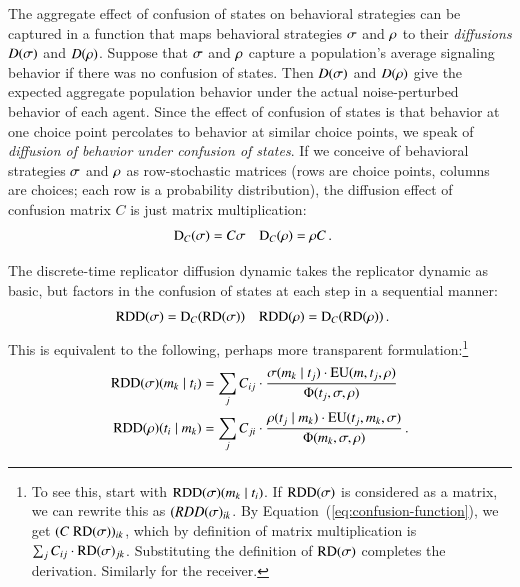 \documentclass[fleqn,reqno,10pt]{article}
\newcommand{\RD}{\ensuremath{\mathrm{RD}}} %
\newcommand{\RDD}{\ensuremath{\mathrm{RDD}}} %
\newcommand{\Diff}{\ensuremath{\mathrm{D}}} %
\begin{document}
The aggregate effect of confusion of states on behavioral strategies
can be captured in a function that maps behavioral strategies
$\sigma$ and $\rho$ to their \emph{diffusions} $D(\sigma)$ and
$D(\rho)$. Suppose that $\sigma$ and $\rho$ capture a
population's average signaling behavior if there was no confusion of
states. Then $D(\sigma)$ and $D(\rho)$ give the expected aggregate
population behavior under the actual noise-perturbed behavior of each
agent. Since the effect of confusion of states is that behavior at one
choice point percolates to behavior at similar choice points, we speak
of \emph{diffusion of behavior under confusion of states}. If we
conceive of behavioral strategies $\sigma$ and $\rho$ as
row-stochastic matrices (rows are choice points, columns are choices;
each row is a probability distribution), the diffusion effect of
confusion matrix $C$ is just matrix multiplication:
\begin{align}
  \label{eq:confusion-function}
  \Diff_C(\Sstrat) & = C \Sstrat &    \Diff_C(\Rstrat) & = \Rstrat C\,.
\end{align}

The discrete-time replicator diffusion dynamic takes the replicator
dynamic as basic, but factors in the confusion of states at each step
in a sequential manner:
\begin{align*}
  \RDD(\Sstrat) & = \Diff_C(\RD(\Sstrat)) &   \RDD(\Rstrat) & = \Diff_C(\RD(\Rstrat)) \,.
\end{align*}
This is equivalent to the following, perhaps more transparent
formulation:\footnote{To see this, start with $\RDD(\Sstrat)(\messg_k
  \probbar \state_i)$. If $\RDD(\Sstrat)$ is considered as a matrix,
  we can rewrite this as $(RDD(\sigma)_{ik}$. By
  Equation~(\ref{eq:confusion-function}), we get $(C \
  \RD(\Sstrat))_{ik}$, which by definition of matrix multiplication is
  $\sum_j C_{ij} \cdot \RD(\Sstrat)_{jk}$. Substituting the definition
  of $\RD(\Sstrat)$ completes the derivation. Similarly for the
  receiver.}
\begin{align*}
  \RDD(\Sstrat)(\messg_k \probbar \state_i) & = \sum_{j} C_{ij} \cdot
  \frac{\Sstrat(\messg_k \probbar \state_j) \cdot
    \EU(\messg, \state_j,\Rstrat)}
  {\Phi(\state_j,\Sstrat, \Rstrat)} \\
    \RDD(\Rstrat)(\state_i \probbar \messg_k) & = \sum_{j} C_{ji} \cdot
  \frac{\Rstrat(\state_j \probbar \messg_k) \cdot
    \EU(\state_j, \messg_k,\Sstrat)} {\Phi(\messg_k,\Sstrat, \Rstrat)}  \,.
\end{align*}
\end{document}
